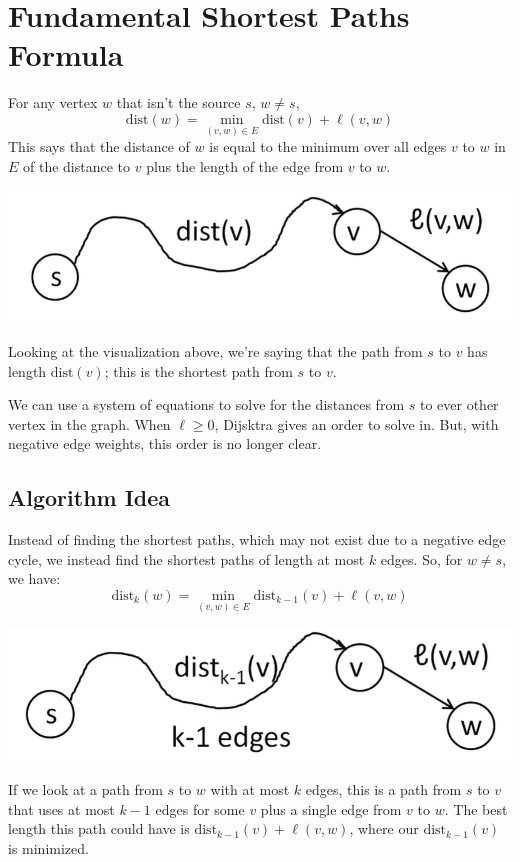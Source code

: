 \documentclass[letterpaper]{article}
\begin{document}
\section{Fundamental Shortest Paths Formula}
For any vertex $w$ that isn't the source $s$, $w \neq s$,
\[\text{dist}(w) = \min_{(v, w) \in E} \text{dist}(v) + \ell(v, w)\]
This says that the distance of $w$ is equal to the minimum over all edges $v$ to $w$ in $E$ of the distance to $v$ plus the length of the edge from $v$ to $w$. 
\begin{center}
    \includegraphics[scale=0.4]{../assets/fun_sho_path.png}
\end{center}
Looking at the visualization above, we're saying that the path from $s$ to $v$ has length $\text{dist}(v)$; this is the shortest path from $s$ to $v$.

\bigskip 

We can use a system of equations to solve for the distances from $s$ to ever other vertex in the graph. When $\ell \geq 0$, Dijsktra gives an order to solve in. But, with negative edge weights, this order is no longer clear. 

\subsection{Algorithm Idea}
Instead of finding the shortest paths, which may not exist due to a negative edge cycle, we instead find the shortest paths of length at most $k$ edges. So, for $w \neq s$, we have: 
\[\text{dist}_{k}(w) = \min_{(v, w) \in E} \text{dist}_{k - 1}(v) + \ell(v, w)\]
\begin{center}
    \includegraphics[scale=0.4]{../assets/fun_sho_path_2.png}
\end{center}
If we look at a path from $s$ to $w$ with at most $k$ edges, this is a path from $s$ to $v$ that uses at most $k - 1$ edges for some $v$ plus a single edge from $v$ to $w$. The best length this path could have is $\text{dist}_{k - 1}(v) + \ell(v, w)$, where our $\text{dist}_{k - 1}(v)$ is minimized. 
\end{document}
